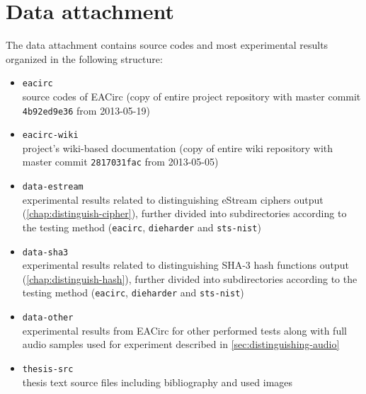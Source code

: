 \documentclass[12pt,twoside]{fithesis2}		%
\renewcommand{\_}{\leavevmode \kern0.0em\vbox{\hrule width0.4em}}
\newcommand{\squarebullet}{\textcolor{black}{\raisebox{0.15em}{\rule{4pt}{4pt}}}}
\newenvironment{myItemize}{
  \begin{itemize}[leftmargin=2em,rightmargin=1em,itemsep=\parskip ,parsep=0em,topsep=0em,partopsep=0em]
  \renewcommand{\labelitemi}{\squarebullet}
  \renewcommand{\labelitemii}{$\diamond$}
}{
  \end{itemize}
}
\begin{document}
\appendix

\nocite{*}
\printbibliography

\chapter{Data attachment}

The data attachment contains source codes and most experimental results organized in the following structure:
\begin{myItemize}
\item \texttt{eacirc}\\
source codes of EACirc (copy of entire project repository with master commit \texttt{4b92ed9e36} from 2013-05-19)
\item \texttt{eacirc-wiki}\\
project's wiki-based documentation (copy of entire wiki repository with master commit \texttt{2817031fac} from 2013-05-05)
\item \texttt{data-estream}\\
experimental results related to distinguishing eStream ciphers output (\autoref{chap:distinguish-cipher}), 
further divided into subdirectories according to the testing method (\texttt{eacirc}, \texttt{dieharder} and \texttt{sts-nist})
\item \texttt{data-sha3}\\
experimental results related to distinguishing SHA-3 hash functions output (\autoref{chap:distinguish-hash}),
further divided into subdirectories according to the testing method (\texttt{eacirc}, \texttt{dieharder} and \texttt{sts-nist})
\item \texttt{data-other}\\
experimental results from EACirc for other performed tests along with full audio samples used for experiment described
in \autoref{sec:distinguishing-audio}
\item \texttt{thesis-src}\\
thesis text source files including bibliography and used images
\end{myItemize}
\end{document}
